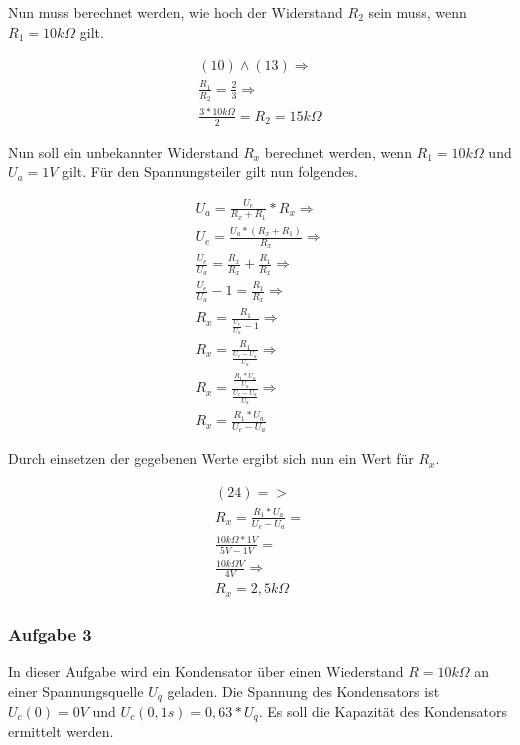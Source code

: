 Nun muss berechnet werden, wie hoch der Widerstand $R_2$ sein muss, wenn $R_1 = 10k\Omega$ gilt.

\begin{align}
    (10) \land (13) \Rightarrow \\
    \frac{R_1}{R_2} = \frac{2}{3} \Rightarrow \\
    \frac{3 * 10k\Omega}{2} = R_2 = 15k\Omega
\end{align}

Nun soll ein unbekannter Widerstand $R_x$ berechnet werden, wenn $R_1 = 10k\Omega$ und $U_a = 1V$ gilt.
Für den Spannungsteiler gilt nun folgendes.

\begin{align}
    U_a = \frac{U_e}{R_x + R_1} * R_x \Rightarrow \\
    U_e = \frac{U_a * (R_x + R_1)}{R_x} \Rightarrow \\
    \frac{U_e}{U_a} = \frac{R_x}{R_x} + \frac{R_1}{R_x} \Rightarrow \\
    \frac{U_e}{U_a} - 1 = \frac{R_1}{R_x} \Rightarrow \\
    R_x = \frac{R_1}{\frac{U_e}{U_a} - 1} \Rightarrow \\
    R_x = \frac{R_1}{\frac{U_e - U_a}{U_a}} \Rightarrow\\
    R_x = \frac{\frac{R_1 * U_a}{U_a}}{\frac{U_e - U_a}{U_a}} \Rightarrow \\
    R_x = \frac{R_1 * U_a}{U_e - U_a}
\end{align}

Durch einsetzen der gegebenen Werte ergibt sich nun ein Wert für $R_x$.

\begin{align}
    (24) => \\
    R_x = \frac{R_1 * U_a}{U_e - U_a} = \\
    \frac{10k\Omega * 1V}{5V - 1V} = \\
    \frac{10k\Omega V}{4V} \Rightarrow \\
    R_x = 2,5k\Omega
\end{align}

\newpage

\subsubsection{Aufgabe 3}

In dieser Aufgabe wird ein Kondensator über einen Wiederstand $R = 10k\Omega$ an einer Spannungsquelle $U_q$ geladen.
Die Spannung des Kondensators ist $U_c(0) = 0V$ und $U_c(0,1s) = 0,63 * U_q$.
Es soll die Kapazität des Kondensators ermittelt werden.

